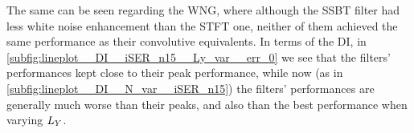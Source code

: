 The same can be seen regarding the WNG, where although the SSBT filter had less white noise enhancement than the STFT one, neither of them achieved the same performance as their convolutive equivalents. In terms of the DI, in \cref{subfig:lineplot__DI__iSER_n15__Ly_var__err_0} we see that the filters' performances kept close to their peak performance, while now (as in \cref{subfig:lineplot__DI__N_var__iSER_n15}) the filters' performances are generally much worse than their peaks, and also than the best performance when varying $\Ly$.
%
%
